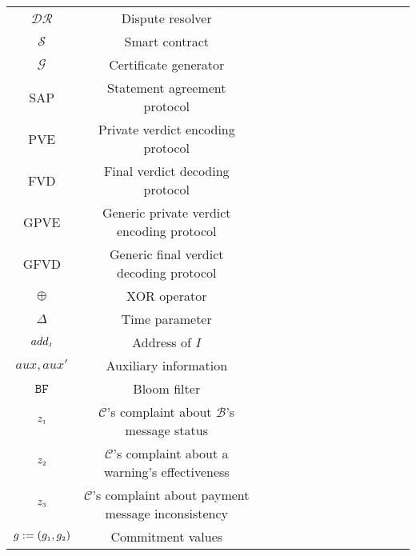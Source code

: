\begin{table*}[!htb]
\begin{scriptsize}
\begin{center}
{{\begin{tabular}{|c|c|c|c|c|c|c|c|c|c|c|c|c|c|}
%
\cellcolor{white!20}\scriptsize$\mathcal{DR}$ &\cellcolor{white!20}\scriptsize Dispute resolver  \\  
%
\cellcolor{gray!20}\scriptsize$\mathcal{S}$ &\cellcolor{gray!20}\scriptsize Smart contract  \\  
%
\cellcolor{white!20}\scriptsize$\mathcal{G}$ &\cellcolor{white!20}\scriptsize Certificate generator  \\  
%
\cellcolor{gray!20}\scriptsize{SAP} &\cellcolor{gray!20}\scriptsize  Statement agreement protocol\\ 
%
\cellcolor{white!20}\scriptsize{PVE} &\cellcolor{white!20}\scriptsize  Private verdict encoding protocol\\ 
%
\cellcolor{gray!20}\scriptsize{FVD} &\cellcolor{gray!20}\scriptsize  Final verdict decoding protocol\\ 
%
\cellcolor{white!20}\scriptsize{GPVE} &\cellcolor{white!20}\scriptsize  Generic private verdict encoding protocol\\ 
%
\cellcolor{gray!20}\scriptsize{GFVD} &\cellcolor{gray!20}\scriptsize  Generic final verdict decoding protocol\\ 
%
\cellcolor{white!20}\scriptsize$\oplus$ &\cellcolor{white!20}\scriptsize  XOR operator \\ 
%
\cellcolor{gray!20}\scriptsize$\Delta$ &\cellcolor{gray!20}\scriptsize  Time parameter \\ 
%
\cellcolor{white!20}\scriptsize$add_{\scriptscriptstyle I}$ &\cellcolor{white!20}\scriptsize  Address of $I$\\ 
%
\cellcolor{gray!20}\scriptsize$aux, aux'$ &\cellcolor{gray!20}\scriptsize  Auxiliary information\\ 
%
\cellcolor{white!20}\scriptsize$\mathtt{BF}$ &\cellcolor{white!20}\scriptsize  Bloom filter\\ 
%
\cellcolor{gray!20}\scriptsize$z_{\scriptscriptstyle 1}$ &\cellcolor{gray!20}\scriptsize  $\mathcal{C}$'s complaint about $\mathcal{B}$'s message status\\ 
%
\cellcolor{white!20}\scriptsize$z_{\scriptscriptstyle 2}$ &\cellcolor{white!20}\scriptsize  $\mathcal{C}$'s complaint about a warning's effectiveness\\
% 
\cellcolor{gray!20}\scriptsize$z_{\scriptscriptstyle 3}$ &\cellcolor{gray!20}\scriptsize  $\mathcal{C}$'s complaint about payment message  inconsistency\\ 
%
\cellcolor{white!20}\scriptsize $g:=(g_{\scriptscriptstyle 1}, g_{\scriptscriptstyle 2})$&\cellcolor{white!20}\scriptsize  Commitment values \\    
%




\end{tabular}}}
\end{center}
\end{scriptsize}
\end{table*}
